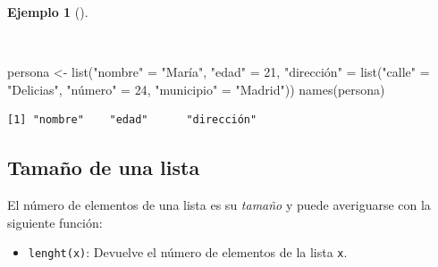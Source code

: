\documentclass[
  a4paper,
]{scrreport}
\newenvironment{Shaded}{\begin{snugshade}}{\end{snugshade}}
\newcommand{\DecValTok}[1]{\textcolor[rgb]{0.68,0.00,0.00}{#1}}
\newcommand{\FunctionTok}[1]{\textcolor[rgb]{0.28,0.35,0.67}{#1}}
\newcommand{\NormalTok}[1]{\textcolor[rgb]{0.00,0.23,0.31}{#1}}
\newcommand{\OtherTok}[1]{\textcolor[rgb]{0.00,0.23,0.31}{#1}}
\newcommand{\StringTok}[1]{\textcolor[rgb]{0.13,0.47,0.30}{#1}}
\providecommand{\tightlist}{%
  \setlength{\itemsep}{0pt}\setlength{\parskip}{0pt}}\usepackage{longtable,booktabs,array}
\theoremstyle{definition}
\theoremstyle{definition}
\newtheorem{example}{Ejemplo}[chapter]
\theoremstyle{remark}
\begin{document}
\begin{example}[]\protect\hypertarget{exm-acceso-listas}{}\label{exm-acceso-listas}

~

\begin{Shaded}
\begin{Highlighting}[]
\NormalTok{persona }\OtherTok{\textless{}{-}} \FunctionTok{list}\NormalTok{(}\StringTok{"nombre"} \OtherTok{=} \StringTok{"María"}\NormalTok{, }\StringTok{"edad"} \OtherTok{=} \DecValTok{21}\NormalTok{, }\StringTok{"dirección"} \OtherTok{=} \FunctionTok{list}\NormalTok{(}\StringTok{"calle"} \OtherTok{=} \StringTok{"Delicias"}\NormalTok{, }\StringTok{"número"} \OtherTok{=} \DecValTok{24}\NormalTok{, }\StringTok{"municipio"} \OtherTok{=} \StringTok{"Madrid"}\NormalTok{))}
\FunctionTok{names}\NormalTok{(persona)}
\end{Highlighting}
\end{Shaded}

\begin{verbatim}
[1] "nombre"    "edad"      "dirección"
\end{verbatim}

\end{example}

\hypertarget{tamauxf1o-de-una-lista}{%
\subsection{Tamaño de una lista}\label{tamauxf1o-de-una-lista}}

El número de elementos de una lista es su \emph{tamaño} y puede
averiguarse con la siguiente función:

\begin{itemize}
\tightlist
\item
  \texttt{lenght(x)}: Devuelve el número de elementos de la lista
  \texttt{x}.
\end{itemize}
\end{document}
